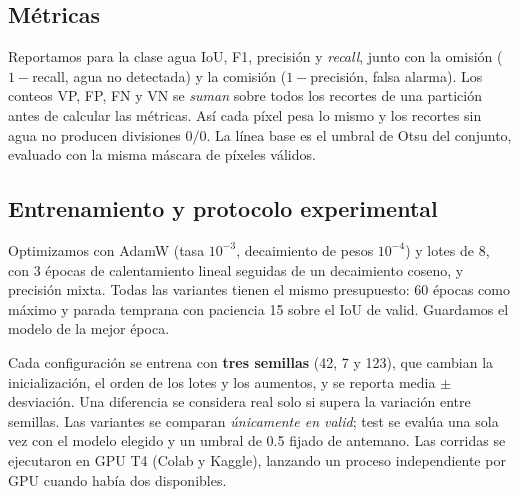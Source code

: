 \subsection{Métricas}
Reportamos para la clase agua IoU, F1, precisión y \emph{recall}, junto con la omisión
($1-$recall, agua no detectada) y la comisión ($1-$precisión, falsa alarma). Los conteos VP, FP,
FN y VN se \emph{suman} sobre todos los recortes de una partición antes de calcular las
métricas. Así cada píxel pesa lo mismo y los recortes sin agua no producen divisiones $0/0$. La
línea base es el umbral de Otsu del conjunto, evaluado con la misma máscara de píxeles válidos.

\subsection{Entrenamiento y protocolo experimental}
Optimizamos con AdamW (tasa $10^{-3}$, decaimiento de pesos $10^{-4}$) y lotes de 8, con 3
épocas de calentamiento lineal seguidas de un decaimiento coseno, y precisión mixta. Todas las
variantes tienen el mismo presupuesto: 60 épocas como máximo y parada temprana con paciencia 15
sobre el IoU de valid. Guardamos el modelo de la mejor época.

Cada configuración se entrena con \textbf{tres semillas} (42, 7 y 123), que cambian la
inicialización, el orden de los lotes y los aumentos, y se reporta media $\pm$ desviación. Una
diferencia se considera real solo si supera la variación entre semillas. Las variantes se
comparan \emph{únicamente en valid}; test se evalúa una sola vez con el modelo elegido y un
umbral de 0.5 fijado de antemano. Las corridas se ejecutaron en GPU T4 (Colab y Kaggle),
lanzando un proceso independiente por GPU cuando había dos disponibles.
